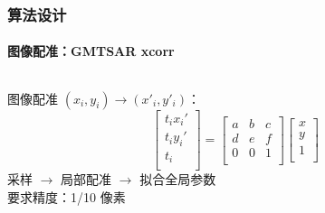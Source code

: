 \documentclass{beamer}
\begin{document}
\begin{frame}
    \frametitle{算法设计}
    \framesubtitle{图像配准：GMTSAR xcorr}

    \begin{columns}
        \begin{column}{0.5\textwidth}
            \footnotesize
            \begin{center}
                图像配准 $(x_i, y_i) \to (x'_i, y'_i)$：
                \begin{equation*}
                    \begin{bmatrix}
                        t_i x_i' \\
                        t_i y_i' \\
                        t_i \\
                    \end{bmatrix}
                    = \begin{bmatrix}
                        a & b & c \\
                        d & e & f \\
                        0 & 0 & 1 \\
                    \end{bmatrix}
                    \begin{bmatrix}
                        x \\
                        y \\
                        1 \\
                    \end{bmatrix}
                \end{equation*}
                采样 $\to$ 局部配准 $\to$ 拟合全局参数\\
                要求精度：1/10 像素
            \end{center}


\end{column}
\end{columns}
\end{frame}
\end{document}
